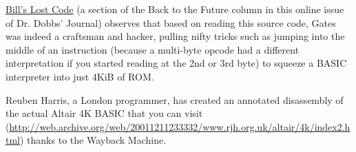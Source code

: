 \href{http://www.drdobbs.com/back-to-the-future/184404733}{Bill's
  Lost Code} (a section of the Back to the Future column in this online
issue of Dr. Dobbs' Journal) observes that based on reading this source
code, Gates was indeed a craftsman and hacker, pulling nifty tricks such
as jumping into the middle of an instruction (because a multi-byte
opcode had a different interpretation if you started reading at the 2nd
or 3rd byte) to squeeze a BASIC interpreter into just 4KiB of ROM.


Reuben Harris, a London programmer, has created an
annotated
disassembly of the actual Altair 4K BASIC 
that you can visit (\url{http://web.archive.org/web/20011211233332/www.rjh.org.uk/altair/4k/index2.html}) thanks to the
Wayback Machine.

